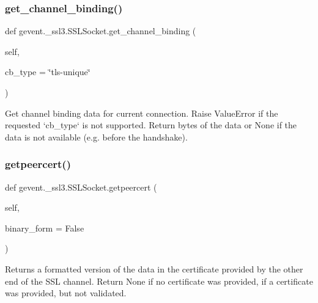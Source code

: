 \subsubsection{\texorpdfstring{get\+\_\+channel\+\_\+binding()}{get\_channel\_binding()}}
{\footnotesize\ttfamily def gevent.\+\_\+ssl3.\+S\+S\+L\+Socket.\+get\+\_\+channel\+\_\+binding (\begin{DoxyParamCaption}\item[{}]{self,  }\item[{}]{cb\+\_\+type = {\ttfamily \char`\"{}tls-\/unique\char`\"{}} }\end{DoxyParamCaption})}

\begin{DoxyVerb}Get channel binding data for current connection.  Raise ValueError
if the requested `cb_type` is not supported.  Return bytes of the data
or None if the data is not available (e.g. before the handshake).
\end{DoxyVerb}
 \mbox{\label{classgevent_1_1__ssl3_1_1_s_s_l_socket_a6df3214312f129e952b5ca4e171653ab}} 
\subsubsection{\texorpdfstring{getpeercert()}{getpeercert()}}
{\footnotesize\ttfamily def gevent.\+\_\+ssl3.\+S\+S\+L\+Socket.\+getpeercert (\begin{DoxyParamCaption}\item[{}]{self,  }\item[{}]{binary\+\_\+form = {\ttfamily False} }\end{DoxyParamCaption})}

\begin{DoxyVerb}Returns a formatted version of the data in the
certificate provided by the other end of the SSL channel.
Return None if no certificate was provided, {} if a
certificate was provided, but not validated.\end{DoxyVerb}
 \mbox{\label{classgevent_1_1__ssl3_1_1_s_s_l_socket_aac03dec1f89aded382df4440f5c3d646}} 
